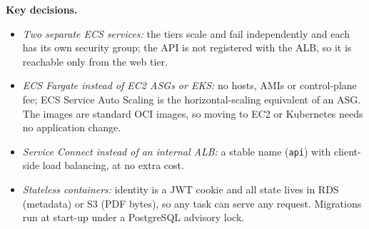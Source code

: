 \documentclass[11pt,a4paper]{article}
\begin{document}
\textbf{Key decisions.}
\begin{itemize}
  \item \emph{Two separate ECS services:} the tiers scale and fail
        independently and each has its own security group; the API is not
        registered with the ALB, so it is reachable only from the web tier.
  \item \emph{ECS Fargate instead of EC2 ASGs or EKS:} no hosts, AMIs or
        control-plane fee; ECS Service Auto Scaling is the horizontal-scaling
        equivalent of an ASG. The images are standard OCI images, so moving to
        EC2 or Kubernetes needs no application change.
  \item \emph{Service Connect instead of an internal ALB:} a stable name
        (\texttt{api}) with client-side load balancing, at no extra cost.
  \item \emph{Stateless containers:} identity is a JWT cookie and all state
        lives in RDS (metadata) or S3 (PDF bytes), so any task can serve any
        request. Migrations run at start-up under a PostgreSQL advisory lock.
\end{itemize}

\end{document}

